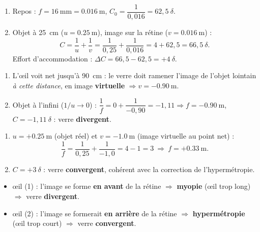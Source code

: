 \documentclass[11pt,a4paper]{article}
\begin{document}

\begin{corrige}
\begin{enumerate}[label=\alph*)]
  \item Repos : $f=\qty{16}{\mm}=\qty{0.016}{\m}$, $C_0=\dfrac{1}{0,016}=62{,}5~\delta$.
  \item Objet à \qty{25}{\cm} ($u=\qty{0.25}{\m}$), image sur la rétine ($v=\qty{0.016}{\m}$) :
        \[ C=\frac{1}{u}+\frac{1}{v}=\frac{1}{0,25}+\frac{1}{0,016}=4+62{,}5=66{,}5~\delta. \]
        Effort d'accommodation : $\Delta C=66{,}5-62{,}5=+4~\delta$.
\end{enumerate}
\end{corrige}

\begin{corrige}
\begin{enumerate}[label=\alph*)]
  \item L'\oe il voit net jusqu'à \qty{90}{\cm} : le verre doit ramener l'image de l'objet lointain
        \emph{à cette distance}, en image \textbf{virtuelle} $\Rightarrow v=-\qty{0.90}{\m}$.
  \item Objet à l'infini ($1/u\to 0$) :
        $\dfrac{1}{f}=0+\dfrac{1}{-0,90}=-1{,}11\Rightarrow f=-\qty{0.90}{\m}$,
        $C=-1{,}11~\delta$ : verre \textbf{divergent}.
\end{enumerate}
\end{corrige}

\begin{corrige}
\begin{enumerate}[label=\alph*)]
  \item $u=+\qty{0.25}{\m}$ (objet réel) et $v=-\qty{1.0}{\m}$ (image virtuelle au point net) :
        \[ \frac{1}{f}=\frac{1}{0,25}+\frac{1}{-1,0}=4-1=3\ \Rightarrow\ f=+\qty{0.33}{\m}. \]
  \item $C=+3~\delta$ : verre \textbf{convergent}, cohérent avec la correction de l'hypermétropie.
\end{enumerate}
\end{corrige}

\begin{corrige}
\begin{itemize}[label=--,leftmargin=1.4em,topsep=2pt,itemsep=2pt]
  \item \oe il (1) : l'image se forme \textbf{en avant} de la rétine $\Rightarrow$ \textbf{myopie}
        (\oe il trop long) $\Rightarrow$ verre \textbf{divergent}.
  \item \oe il (2) : l'image se formerait \textbf{en arrière} de la rétine $\Rightarrow$
        \textbf{hypermétropie} (\oe il trop court) $\Rightarrow$ verre \textbf{convergent}.
\end{itemize}
\end{corrige}
\end{document}
